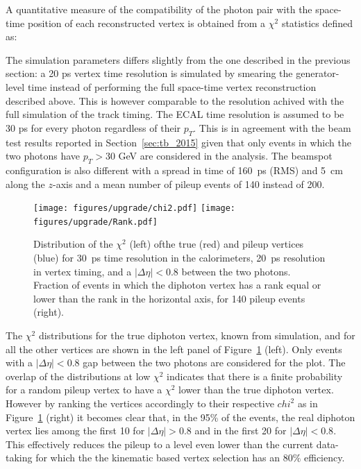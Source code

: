 A quantitative measure of  the compatibility of the photon pair with
the space-time position of each reconstructed vertex is obtained from
a $\chi^2$ statistics defined as:

The simulation parameters differs slightly from the one described in the previous section:
a 20 ps vertex time resolution is simulated by smearing the generator-level time instead of
performing the full space-time vertex reconstruction described above. This is however
comparable to the resolution achived with the full simulation of the track timing.
The ECAL time resolution is assumed to be 30 ps for every photon regardless of their $p_T$. This
is in agreement with the beam test results reported in Section~\ref{sec:tb_2015} given that only
events in which the two photons have $p_T>30$ GeV are considered in the analysis.
The beamspot configuration is also different with a spread in time of 160~ps (RMS) and 5~cm along the $z$-axis and
a mean number of pileup events of 140 instead of 200.

\begin{figure}[htb!]
\centering
\texttt{[image: figures/upgrade/chi2.pdf]}
\texttt{[image: figures/upgrade/Rank.pdf]}
\caption{Distribution of the $\chi^2$ (left) ofthe true \Hgg (red) and pileup vertices (blue) for 30~ps
  time resolution in the calorimeters, 20~ps resolution in vertex timing,
  and a $|\Delta\eta|<0.8$ between the two photons. Fraction
  of events in which the diphoton vertex has a rank equal or lower
  than the rank in the horizontal axis, for 140 pileup events (right).} 
\label{fig:chi2Hgg}
\end{figure}

The $\chi^2$ distributions for the true diphoton vertex, known from
simulation, and for all the other vertices are shown in the left panel
of Figure~\ref{fig:chi2Hgg} (left).  
Only events with a $|\Delta\eta|<0.8$ gap between the two photons are considered for the plot.
The overlap of the distributions at low $\chi^2$ indicates that there is a finite
probability for a random pileup vertex to have a $\chi^2$ lower than
the true diphoton vertex.
However by ranking the vertices accordingly to their respective $chi^2$ 
as in Figure~\ref{fig:chi2Hgg} (right) it becomes clear that, in the 95\% of the events,
the real diphoton vertex lies among the first 10 for $|\Delta\eta|>0.8$ and
in the first 20 for $|\Delta\eta|<0.8$. This effectively reduces the pileup to
a level even lower than the current data-taking for which the the kinematic based vertex selection
has an $80\%$ efficiency.

